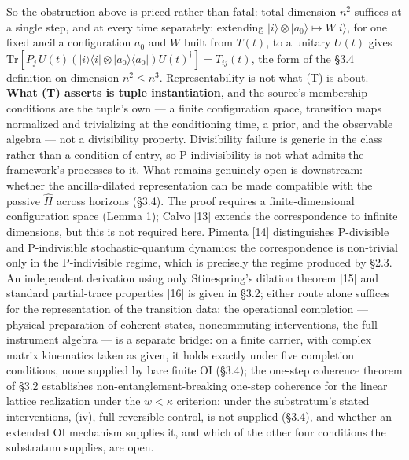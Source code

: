 \documentclass[
]{article}
\begin{document}
So the obstruction above is priced rather than fatal: total dimension
\(n^2\) suffices at a single step, and at every time separately:
extending \(|i\rangle \otimes |a_0\rangle \mapsto W|i\rangle\), for one
fixed ancilla configuration \(a_0\) and \(W\) built from \(T(t)\), to a
unitary \(U(t)\) gives
\(\mathrm{Tr}[P_j\, U(t) (|i\rangle\langle i| \otimes |a_0\rangle\langle a_0|) U(t)^\dagger] = T_{ij}(t)\),
the form of the §3.4 definition on dimension \(n^2 \leq n^3\).
Representability is not what (T) is about. \textbf{What (T) asserts is
tuple instantiation}, and the source's membership conditions are the
tuple's own --- a finite configuration space, transition maps normalized
and trivializing at the conditioning time, a prior, and the observable
algebra --- not a divisibility property. Divisibility failure is generic
in the class rather than a condition of entry, so P-indivisibility is
not what admits the framework's processes to it. What remains genuinely
open is downstream: whether the ancilla-dilated representation can be
made compatible with the passive \(\hat{H}\) across horizons (§3.4). The
proof requires a finite-dimensional configuration space (Lemma 1); Calvo
{[}13{]} extends the correspondence to infinite dimensions, but this is
not required here. Pimenta {[}14{]} distinguishes P-divisible and
P-indivisible stochastic-quantum dynamics: the correspondence is
non-trivial only in the P-indivisible regime, which is precisely the
regime produced by §2.3. An independent derivation using only
Stinespring's dilation theorem {[}15{]} and standard partial-trace
properties {[}16{]} is given in §3.2; either route alone suffices for
the representation of the transition data; the operational completion
--- physical preparation of coherent states, noncommuting interventions,
the full instrument algebra --- is a separate bridge: on a finite
carrier, with complex matrix kinematics taken as given, it holds exactly
under five completion conditions, none supplied by bare finite OI
(§3.4); the one-step coherence theorem of §3.2 establishes
non-entanglement-breaking one-step coherence for the linear lattice
realization under the \(w<\kappa\) criterion; under the substratum's
stated interventions, (iv), full reversible control, is not supplied
(§3.4), and whether an extended OI mechanism supplies it, and which of
the other four conditions the substratum supplies, are open.
\end{document}
